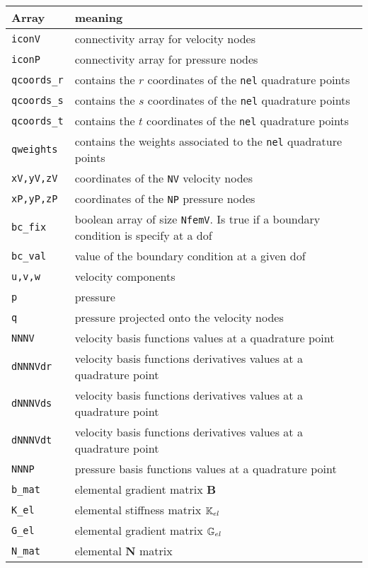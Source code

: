 \documentclass[a4paper,11pt]{report}
\begin{document}
\vspace{.5cm}

\begin{tabular}{p{3.5cm}p{12.5cm}}
\hline
Array & meaning \\
\hline
\hline
{\tt iconV} & connectivity array for velocity nodes \\
{\tt iconP} & connectivity array for pressure nodes \\
{\tt qcoords\_r} & contains the $r$ coordinates of the {\tt nel} quadrature points \\
{\tt qcoords\_s} & contains the $s$ coordinates of the {\tt nel} quadrature points \\
{\tt qcoords\_t} & contains the $t$ coordinates of the {\tt nel} quadrature points \\
{\tt qweights} & contains the weights associated to the {\tt nel} quadrature points \\
{\tt xV,yV,zV} & coordinates of the {\tt NV} velocity nodes \\
{\tt xP,yP,zP} & coordinates of the {\tt NP} pressure nodes \\
{\tt bc\_fix} & boolean array of size {\tt NfemV}. Is true if a boundary condition
                is specify at a dof \\
{\tt bc\_val} & value of the boundary condition at a given dof \\
{\tt u,v,w} & velocity components \\ 
{\tt p} & pressure \\ 
{\tt q} & pressure projected onto the velocity nodes\\
{\tt NNNV} & velocity basis functions values at a quadrature point \\
{\tt dNNNVdr} & velocity basis functions derivatives values at a quadrature point \\
{\tt dNNNVds} & velocity basis functions derivatives values at a quadrature point \\
{\tt dNNNVdt} & velocity basis functions derivatives values at a quadrature point \\
{\tt NNNP} & pressure basis functions values at a quadrature point \\
{\tt b\_mat} & elemental gradient matrix ${\bm B}$ \\
{\tt K\_el}  & elemental stiffness matrix ${\mathbb{K}}_{el}$ \\
{\tt G\_el}  & elemental gradient matrix ${\mathbb{G}}_{el}$ \\
{\tt N\_mat}  & elemental ${\bm N}$ matrix \\

\end{tabular}
\end{document}
